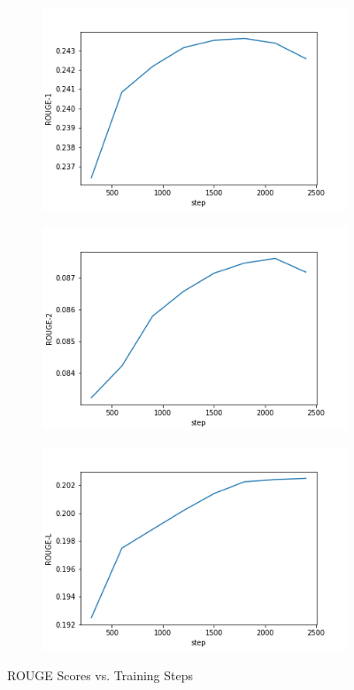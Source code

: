 \documentclass[10pt,a4paper]{article}
\begin{document}
\begin{figure}[H]
  \centering
  \begin{subfigure}{0.32\textwidth}
    \centering
    \includegraphics[width=\textwidth]{fig/rouge1.png}
  \end{subfigure}
  \hfill
  \begin{subfigure}{0.32\textwidth}
    \centering
    \includegraphics[width=\textwidth]{fig/rouge2.png}
  \end{subfigure}
  \hfill
  \begin{subfigure}{0.32\textwidth}
    \centering
    \includegraphics[width=\textwidth]{fig/rougel.png}
  \end{subfigure}
  \caption{ROUGE Scores vs. Training Steps}\label{fig:rouge}
\end{figure}
\end{document}
